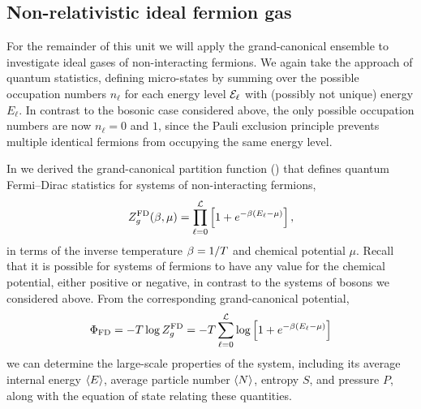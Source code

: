 \subsection{\label{sec:fermi_nonrel}Non-relativistic ideal fermion gas}
For the remainder of this unit we will apply the grand-canonical ensemble to investigate ideal gases of non-interacting fermions.
We again take the approach of quantum statistics, defining micro-states by summing over the possible occupation numbers $n_{\ell}$ for each energy level $\mathcal E_{\ell}$ with (possibly not unique) energy $E_{\ell}$.
In contrast to the bosonic case considered above, the only possible occupation numbers are now $n_{\ell} = 0$ and $1$, since the Pauli exclusion principle prevents multiple identical fermions from occupying the same energy level.

In  we derived the grand-canonical partition function () that defines quantum Fermi--Dirac statistics for systems of non-interacting fermions,
\begin{equation*}
  Z_g^{\text{FD}}(\beta, \mu) = \prod_{\ell = 0}^{\mathcal L} \left[1 + e^{-\beta (E_{\ell} - \mu)}\right],
\end{equation*}
in terms of the inverse temperature $\beta = 1 / T$ and chemical potential $\mu$.
Recall that it is possible for systems of fermions to have any value for the chemical potential, either positive or negative, in contrast to the systems of bosons we considered above.
From the corresponding grand-canonical potential,
\begin{equation*}
  \Phi_{\text{FD}} = -T\log Z_g^{\text{FD}} = -T \sum_{\ell = 0}^{\mathcal L} \log\left[1 + e^{-\beta (E_{\ell} - \mu)}\right]
\end{equation*}
we can determine the large-scale properties of the system, including its average internal energy $\left\langle E \right\rangle$, average particle number $\left\langle N \right\rangle$, entropy $S$, and pressure $P$, along with the equation of state relating these quantities.

